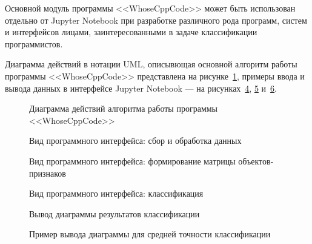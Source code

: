 Основной модуль программы <<WhoseCppCode>> может быть использован отдельно от Jupyter Notebook 
при разработке различного рода программ, систем и интерфейсов лицами, заинтересованными в задаче
классификации программистов.

Диаграмма действий в нотации UML, описывющая основной алгоритм работы программы <<WhoseCppCode>>
представлена на рисунке~\ref{flowchart:flowchart}, примеры ввода и вывода данных в интерфейсе Jupyter 
Notebook --- на рисунках~\ref{main_module:main_module}, \ref{newplot:newplot} и~\ref{newplot2:newplot2}.

\begin{figure}[h!]
\caption{ Диаграмма действий алгоритма работы программы <<WhoseCppCode>> }
\label{flowchart:flowchart}
\end{figure}


\begin{figure}[h!]
\caption{ Вид программного интерфейса: сбор и обработка данных }
\label{main_module:main_module}
\end{figure}


\begin{figure}[h!]
\caption{ Вид программного интерфейса: формирование матрицы объектов-признаков }
\label{main_module:main_module}
\end{figure}

\begin{figure}[h!]
\caption{ Вид программного интерфейса: классификация }
\label{main_module:main_module}
\end{figure}


\begin{figure}[h!]
\caption{ Вывод диаграммы результатов классификации }
\label{newplot:newplot}
\end{figure}

\begin{figure}[t!]
\caption{ Пример вывода диаграммы для средней точности классификации }
\label{newplot2:newplot2}
\end{figure}




